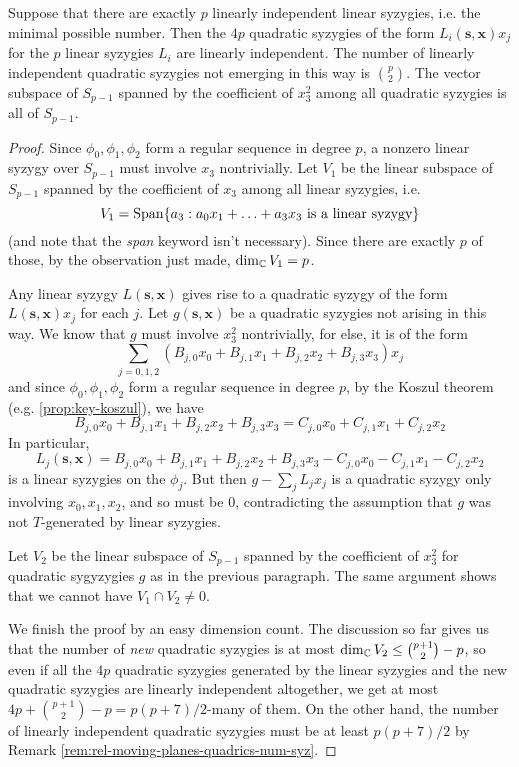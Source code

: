 \documentclass[fleqn,reqno]{amsart}
\begin{document}
\begin{lemma}
	\label{lemma:rel-moving-planes-quadrics-main}
	Suppose that there are exactly $p$ linearly independent linear syzygies, i.e. the minimal possible number.
	Then the $4p$ quadratic syzygies of the form $L_i(\mathbf s,\mathbf x)x_j$ for the $p$ linear syzygies $L_i$
	are linearly independent. The number of linearly independent quadratic syzygies not emerging in this way
	is $\binom{p}{2}$. The vector subspace of $S_{p-1}$ spanned by the coefficient of $x_3^2$ among all
	quadratic syzygies is all of $S_{p-1}$.
\end{lemma}

\begin{proof}
	Since $\phi_0,\phi_1,\phi_2$ form a regular sequence in degree $p$,
	a nonzero linear syzygy over $S_{p-1}$ must involve $x_3$ nontrivially.
	Let $V_1$ be the linear subspace of $S_{p-1}$ spanned by the
	coefficient of $x_3$ among all linear syzygies, i.e.
	\[
		V_1=\operatorname{Span}\{a_3:a_0x_1+\ldots+a_3x_3 \text{ is a linear syzygy}\}
	\]
	(and note that the {\em span} keyword isn't necessary).
	Since there are exactly $p$ of those, by the observation just made, $\dim_{\mathbb{C}} V_1=p$.
	
	Any linear syzygy $L(\mathbf s, \mathbf x)$ gives rise to a quadratic syzygy of the form
	$L(\mathbf s, \mathbf x)x_j$ for each $j$.
	Let $g(\mathbf s,\mathbf x)$ be a quadratic syzygies not arising in this way.
	We know that $g$ must involve $x_3^2$ nontrivially,
	for else, it is of the form
	\[
		\sum_{j=0,1,2} (B_{j,0}x_0+B_{j,1}x_1+B_{j,2}x_2+B_{j,3}x_3) x_j
	\]
	and since $\phi_0,\phi_1,\phi_2$ form a regular sequence in degree $p$,
	by the Koszul theorem (e.g. \ref{prop:key-koszul}),
	we have
	\[
		B_{j,0}x_0+B_{j,1}x_1+B_{j,2}x_2+B_{j,3}x_3=C_{j,0}x_0+C_{j,1}x_1+C_{j,2}x_2
	\]
	In particular,
	\[
		L_j(\mathbf s,\mathbf x)=B_{j,0}x_0+B_{j,1}x_1+B_{j,2}x_2+B_{j,3}x_3-C_{j,0}x_0-C_{j,1}x_1-C_{j,2}x_2
	\]
	is a linear syzygies on the $\phi_j$.
	But then $g-\sum_j L_jx_j$ is a quadratic syzygy only involving $x_0,x_1,x_2$,
	and so must be $0$, contradicting the assumption that $g$ was not $T$-generated by linear syzygies.
	
	Let $V_2$ be the linear subspace of $S_{p-1}$ spanned by the coefficient of $x_3^2$ for quadratic
	sygyzygies $g$ as in the previous paragraph. The same argument shows that we cannot have $V_1\cap V_2\neq0$.
	
	We finish the proof by an easy dimension count.
	The discussion so far gives us that the number of {\em new} quadratic syzygies is at most
	$\dim_{\mathbb{C}} V_2\leq\binom{p+1}{2}-p$,
	so even if all the $4p$ quadratic syzygies generated by the linear syzygies
	and the new quadratic syzygies are linearly independent altogether,
	we get at most $4p+\binom{p+1}{2}-p=p(p+7)/2$-many of them.
	On the other hand,
	the number of linearly independent quadratic syzygies must be at least $p(p+7)/2$
	by Remark \ref{rem:rel-moving-planes-quadrics-num-syz}.
	

\end{proof}
\end{document}
